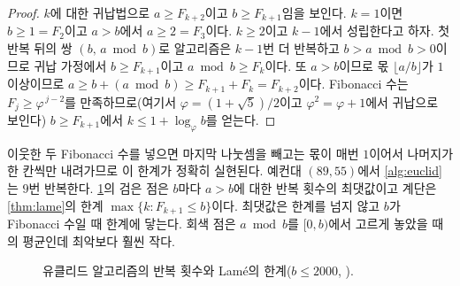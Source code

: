 \begin{proof}
$k$에 대한 귀납법으로 $a\ge F_{k+2}$이고 $b\ge F_{k+1}$임을 보인다. $k=1$이면 $b\ge1=F_2$이고 $a>b$에서 $a\ge2=F_3$이다. $k\ge2$이고 $k-1$에서 성립한다고 하자. 첫 반복 뒤의 쌍 $(b,\,a\bmod b)$로 알고리즘은 $k-1$번 더 반복하고 $b>a\bmod b>0$이므로 귀납 가정에서 $b\ge F_{k+1}$이고 $a\bmod b\ge F_k$이다. 또 $a>b$이므로 몫 $\lfloor a/b\rfloor$가 $1$ 이상이므로 $a\ge b+(a\bmod b)\ge F_{k+1}+F_k=F_{k+2}$이다. Fibonacci 수는 $F_j\ge\varphi^{\,j-2}$를 만족하므로(여기서 $\varphi=(1+\sqrt5)/2$이고 $\varphi^2=\varphi+1$에서 귀납으로 보인다) $b\ge F_{k+1}$에서 $k\le1+\log_\varphi b$를 얻는다.
\end{proof}

이웃한 두 Fibonacci 수를 넣으면 마지막 나눗셈을 빼고는 몫이 매번 $1$이어서 나머지가 한 칸씩만 내려가므로 이 한계가 정확히 실현된다. 예컨대 $(89,55)$에서 \cref{alg:euclid}는 $9$번 반복한다. \cref{fig:euclid-steps}의 검은 점은 $b$마다 $a>b$에 대한 반복 횟수의 최댓값이고 계단은 \cref{thm:lame}의 한계 $\max\{k:F_{k+1}\le b\}$이다. 최댓값은 한계를 넘지 않고 $b$가 Fibonacci 수일 때 한계에 닿는다. 회색 점은 $a\bmod b$를 $[0,b)$에서 고르게 놓았을 때의 평균인데 최악보다 훨씬 작다.

\begin{figure}[htbp]
\centering
{}
\caption{유클리드 알고리즘의 반복 횟수와 Lamé의 한계($b\le2000$, ).}
\label{fig:euclid-steps}
\end{figure}

